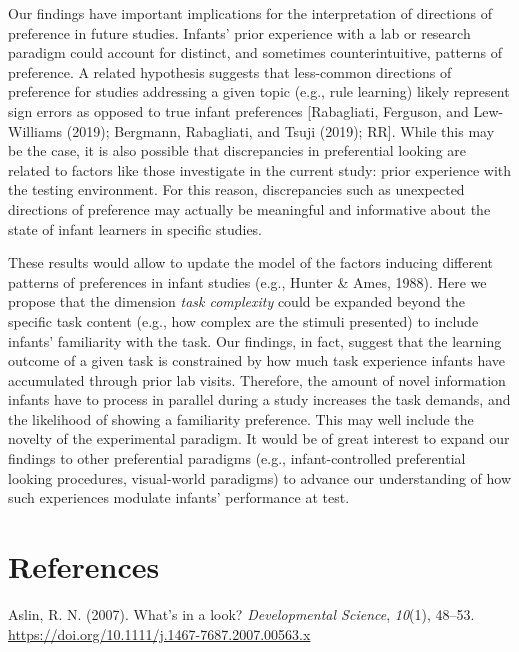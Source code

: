 \documentclass[english,man,man,floatsintext]{apa6}
\begin{document}
Our findings have important implications for the interpretation of directions of preference in future studies. Infants' prior experience with a lab or research paradigm could account for distinct, and sometimes counterintuitive, patterns of preference. A related hypothesis suggests that less-common directions of preference for studies addressing a given topic (e.g., rule learning) likely represent sign errors as opposed to true infant preferences {[}Rabagliati, Ferguson, and Lew-Williams (2019); Bergmann, Rabagliati, and Tsuji (2019); RR{]}. While this may be the case, it is also possible that discrepancies in preferential looking are related to factors like those investigate in the current study: prior experience with the testing environment. For this reason, discrepancies such as unexpected directions of preference may actually be meaningful and informative about the state of infant learners in specific studies.

These results would allow to update the model of the factors inducing different patterns of preferences in infant studies (e.g., Hunter \& Ames, 1988). Here we propose that the dimension \emph{task complexity} could be expanded beyond the specific task content (e.g., how complex are the stimuli presented) to include infants' familiarity with the task. Our findings, in fact, suggest that the learning outcome of a given task is constrained by how much task experience infants have accumulated through prior lab visits. Therefore, the amount of novel information infants have to process in parallel during a study increases the task demands, and the likelihood of showing a familiarity preference. This may well include the novelty of the experimental paradigm. It would be of great interest to expand our findings to other preferential paradigms (e.g., infant-controlled preferential looking procedures, visual-world paradigms) to advance our understanding of how such experiences modulate infants' performance at test.

\newpage

\hypertarget{references}{%
\section{References}\label{references}}

\begingroup
\setlength{\parindent}{-0.5in}
\setlength{\leftskip}{0.5in}

\hypertarget{refs}{}
\leavevmode\hypertarget{ref-aslin2007}{}%
Aslin, R. N. (2007). What's in a look? \emph{Developmental Science}, \emph{10}(1), 48--53. \url{https://doi.org/10.1111/j.1467-7687.2007.00563.x}
\end{document}
